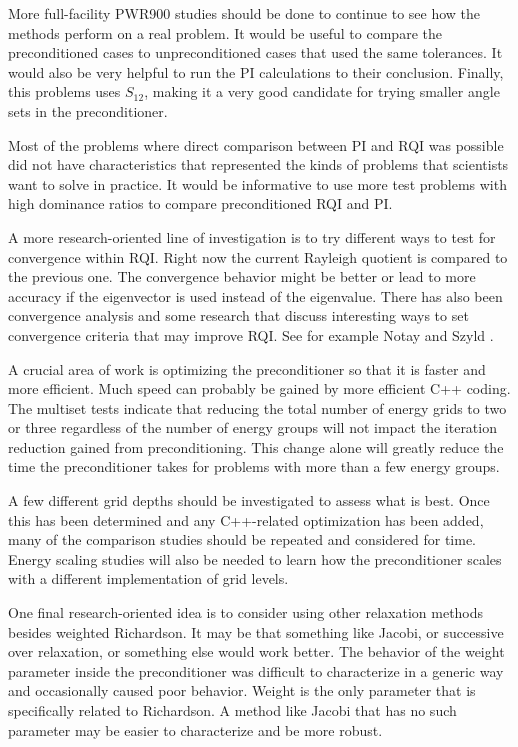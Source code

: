 More full-facility PWR900 studies should be done to continue to see how the methods perform on a real problem. It would be useful to compare the preconditioned cases to unpreconditioned cases that used the same tolerances. It would also be very helpful to run the PI calculations to their conclusion. Finally, this problems uses $S_{12}$, making it a very good candidate for trying smaller angle sets in the preconditioner. 

Most of the problems where direct comparison between PI and RQI was possible did not have characteristics that represented the kinds of problems that scientists want to solve in practice. It would be informative to use more test problems with high dominance ratios to compare preconditioned RQI and PI. 

A more research-oriented line of investigation is to try different ways to test for convergence within RQI. Right now the current Rayleigh quotient is compared to the previous one. The convergence behavior might be better or lead to more accuracy if the eigenvector is used instead of the eigenvalue. There has also been convergence analysis and some research that discuss interesting ways to set convergence criteria that may improve RQI. See for example Notay \cite{Notay2003} and Szyld \cite{Szyld2011}.
  
A crucial area of work is optimizing the preconditioner so that it is faster and more efficient. Much speed can probably be gained by more efficient C++ coding. The multiset tests indicate that reducing the total number of energy grids to two or three regardless of the number of energy groups will not impact the iteration reduction gained from preconditioning. This change alone will greatly reduce the time the preconditioner takes for problems with more than a few energy groups. 

A few different grid depths should be investigated to assess what is best. Once this has been determined and any C++-related optimization has been added, many of the comparison studies should be repeated and considered for time. Energy scaling studies will also be needed to learn how the preconditioner scales with a different implementation of grid levels. 
  
One final research-oriented idea is to consider using other relaxation methods besides weighted Richardson. It may be that something like Jacobi, or successive over relaxation, or something else would work better. The behavior of the weight parameter inside the preconditioner was difficult to characterize in a generic way and occasionally caused poor behavior. Weight is the only parameter that is specifically related to Richardson. A method like Jacobi that has no such parameter may be easier to characterize and be more robust. 

